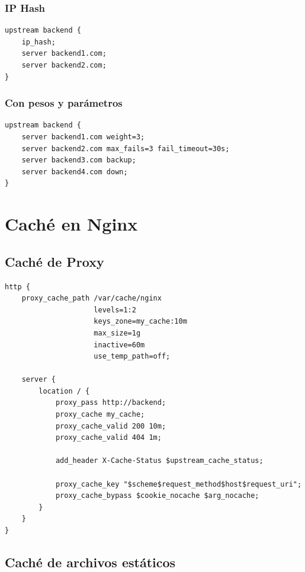 \documentclass[11pt,a4paper]{article}
\begin{document}
\subsubsection{IP Hash}
\begin{lstlisting}
upstream backend {
    ip_hash;
    server backend1.com;
    server backend2.com;
}
\end{lstlisting}

\subsubsection{Con pesos y parámetros}
\begin{lstlisting}
upstream backend {
    server backend1.com weight=3;
    server backend2.com max_fails=3 fail_timeout=30s;
    server backend3.com backup;
    server backend4.com down;
}
\end{lstlisting}

\section{Caché en Nginx}

\subsection{Caché de Proxy}

\begin{lstlisting}[caption=Configuración de caché]
http {
    proxy_cache_path /var/cache/nginx 
                     levels=1:2 
                     keys_zone=my_cache:10m 
                     max_size=1g 
                     inactive=60m 
                     use_temp_path=off;
    
    server {
        location / {
            proxy_pass http://backend;
            proxy_cache my_cache;
            proxy_cache_valid 200 10m;
            proxy_cache_valid 404 1m;
            
            add_header X-Cache-Status $upstream_cache_status;
            
            proxy_cache_key "$scheme$request_method$host$request_uri";
            proxy_cache_bypass $cookie_nocache $arg_nocache;
        }
    }
}
\end{lstlisting}

\subsection{Caché de archivos estáticos}
\end{document}

